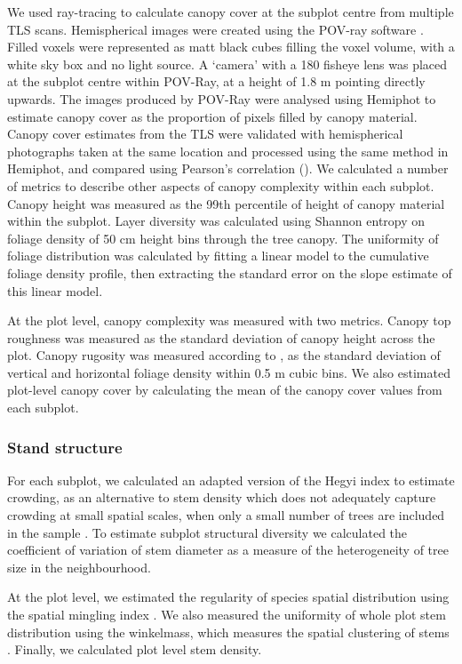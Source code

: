 \documentclass[11pt,a4paper]{article}
\begin{document}
We used ray-tracing to calculate canopy cover at the subplot centre from multiple TLS scans. Hemispherical images were created using the POV-ray software \citep{Povray2004}. Filled voxels were represented as matt black cubes filling the voxel volume, with a white sky box and no light source. A `camera' with a 180\textdegree{} fisheye lens was placed at the subplot centre within POV-Ray, at a height of 1.8 m pointing directly upwards. The images produced by POV-Ray were analysed using Hemiphot \citep{HemiPhot} to estimate canopy cover as the proportion of pixels filled by canopy material. Canopy cover estimates from the TLS were validated with hemispherical photographs taken at the same location and processed using the same method in Hemiphot, and compared using Pearson's correlation (\hemiCor{}). We calculated a number of metrics to describe other aspects of canopy complexity within each subplot. Canopy height was measured as the 99th percentile of height of canopy material within the subplot. Layer diversity was calculated using Shannon entropy on foliage density of 50 cm height bins through the tree canopy. The uniformity of foliage distribution was calculated by fitting a linear model to the cumulative foliage density profile, then extracting the standard error on the slope estimate of this linear model. 

At the plot level, canopy complexity was measured with two metrics. Canopy top roughness was measured as the standard deviation of canopy height across the plot. Canopy rugosity was measured according to \citet{Hardiman2011}, as the standard deviation of vertical and horizontal foliage density within 0.5 m cubic bins. We also estimated plot-level canopy cover by calculating the mean of the canopy cover values from each subplot.

\subsubsection{Stand structure}

For each subplot, we calculated an adapted version of the Hegyi index to estimate crowding, as an alternative to stem density which does not adequately capture crowding at small spatial scales, when only a small number of trees are included in the sample \citep{Hegyi1974}. To estimate subplot structural diversity we calculated the coefficient of variation of stem diameter as a measure of the heterogeneity of tree size in the neighbourhood. 

At the plot level, we estimated the regularity of species spatial distribution using the spatial mingling index \citep{Gadow2002}. We also measured the uniformity of whole plot stem distribution using the winkelmass, which measures the spatial clustering of stems \citep{Gadow2002}. Finally, we calculated plot level stem density.
\end{document}
